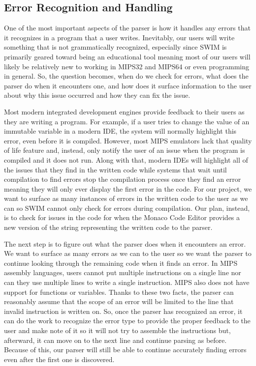 \documentclass[parskip=half, fontsize=12pt]{scrartcl}
\begin{document}
\subsection{Error Recognition and Handling}

One of the most important aspects of the parser is how it handles any
errors that it recognizes in a program that a user writes. Inevitably,
our users will write something that is not grammatically recognized,
especially since SWIM is primarily geared toward being an educational
tool meaning most of our users will likely be relatively new to working
in MIPS32 and MIPS64 or even programming in general. So, the question
becomes, when do we check for errors, what does the parser do when it
encounters one, and how does it surface information to the user about
why this issue occurred and how they can fix the issue.

Most modern integrated development engines provide feedback to their
users as they are writing a program. For example, if a user tries to
change the value of an immutable variable in a modern IDE, the system
will normally highlight this error, even before it is compiled. However,
most MIPS emulators lack that quality of life feature and, instead, only
notify the user of an issue when the program is compiled and it does not
run. Along with that, modern IDEs will highlight all of the issues that
they find in the written code while systems that wait until compilation
to find errors stop the compilation process once they find an error
meaning they will only ever display the first error in the code. For our
project, we want to surface as many instances of errors in the written
code to the user as we can so SWIM cannot only check for errors during
compilation. Our plan, instead, is to check for issues in the code for
when the Monaco Code Editor provides a new version of the string
representing the written code to the parser.

The next step is to figure out what the parser does when it encounters
an error. We want to surface as many errors as we can to the user so we
want the parser to continue looking through the remaining code when it
finds an error. In MIPS assembly languages, users cannot put multiple
instructions on a single line nor can they use multiple lines to write a
single instruction. MIPS also does not have support for functions or
variables. Thanks to these two facts, the parser can reasonably assume
that the scope of an error will be limited to the line that invalid
instruction is written on. So, once the parser has recognized an error,
it can do the work to recognize the error type to provide the proper
feedback to the user and make note of it so it will not try to assemble
the instructions but, afterward, it can move on to the next line and
continue parsing as before. Because of this, our parser will still be
able to continue accurately finding errors even after the first one is
discovered.
\end{document}

